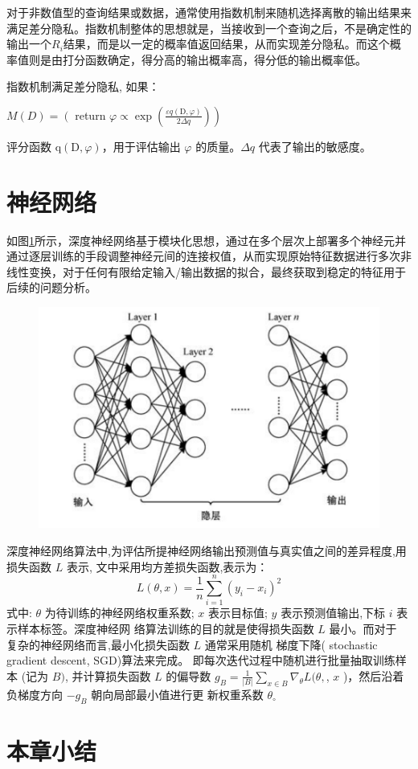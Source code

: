 对于非数值型的查询结果或数据，通常使用指数机制来随机选择离散的输出结果来满足差分隐私。指数机制整体的思想就是，当接收到一个查询之后，不是确定性的输出一个$R_{i}$结果，而是以一定的概率值返回结果，从而实现差分隐私。而这个概率值则是由打分函数确定，得分高的输出概率高，得分低的输出概率低。

\begin{define}[指数机制]\label{指数机制}
指数机制满足差分隐私, 如果：

$M(D)=\left(\right.$ return $\left.\varphi \propto \exp \left(\frac{\varepsilon q(\mathrm{D}, \varphi)}{2 \Delta q}\right)\right)$

评分函数 $\mathrm{q}(\mathrm{D}, \varphi)$，用于评估输出 $\varphi$ 的质量。$\Delta q$ 代表了输出的敏感度。
\end{define}


\section{神经网络}
如图\ref{fig:深度神经网络结构图}所示，深度神经网络基于模块化思想，通过在多个层次上部署多个神经元并通过逐层训练的手段调整神经元间的连接权值，从而实现原始特征数据进行多次非线性变换，对于任何有限给定输入/输出数据的拟合，最终获取到稳定的特征用于后续的问题分析。
\begin{figure}[!hbt]
\centering
	\includegraphics[scale=0.7]{fig2/C2/深度神经网络结构图}%
	\label{fig:深度神经网络结构图}	
\end{figure}

深度神经网络算法中,为评估所提神经网络输出预测值与真实值之间的差异程度,用损失函数 $L$ 表示, 文中采用均方差损失函数,表示为：
$$
L(\theta, x)=\frac{1}{n} \sum_{i=1}^{n}\left(y_{i}-x_{i}\right)^{2}
$$
式中: $\theta$ 为待训练的神经网络权重系数; $x$ 表示目标值; $y$ 表示预测值输出,下标 $i$ 表示样本标签。深度神经网 络算法训练的目的就是使得损失函数 $L$ 最小。而对于 复杂的神经网络而言,最小化损失函数 $L$ 通常采用随机 梯度下降( stochastic gradient descent, SGD)算法来完成。 即每次迭代过程中随机进行批量抽取训练样本 (记为 $B)$, 并计算损失函数 $L$ 的偏导数 $g_{B}=\frac{1}{|B|} \sum_{x \in B} \nabla_{\theta} L(\theta,$, $x$ )，然后沿着负梯度方向 $-g_{B}$ 朝向局部最小值进行更 新权重系数 $\theta_{\circ}$

\section{本章小结}


